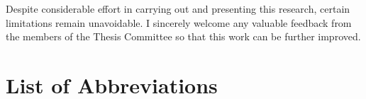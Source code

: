 \documentclass[12pt,a4paper]{report}
\begin{document}
Despite considerable effort in carrying out and presenting this research, certain limitations remain unavoidable. I sincerely welcome any valuable feedback from the members of the Thesis Committee so that this work can be further improved.

\clearpage
\tableofcontents

\clearpage
{}
{}
\listoftables

\clearpage
{}
{}
\listoffigures

\clearpage
\chapter*{List of Abbreviations}
{}
\end{document}
